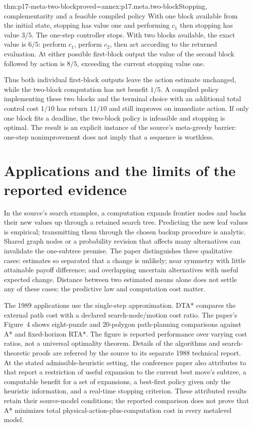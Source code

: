 \begin{hbtheorem}{thm:p17-meta-two-block}{proved=annex:p17.meta.two-block}{Stopping, complementarity and a feasible compiled policy}
With one block available from the initial state, stopping has value one
and performing \(c_1\) then stopping has value \(3/5\).
The one-step controller stops. With two blocks available, the exact
value is \(6/5\): perform \(c_1\), perform \(c_2\), then act
according to the returned evaluation. At either possible first-block
output the value of the second block followed by action is \(8/5\),
exceeding the current stopping value one.

Thus both individual first-block outputs leave the action estimate
unchanged, while the two-block computation has net benefit \(1/5\).
A compiled policy implementing these two blocks and the terminal choice
with an additional total control cost \(1/10\) has return \(11/10\)
and still improves on immediate action. If only one block fits a deadline,
the two-block policy is infeasible and stopping is optimal.
The result is an explicit instance of the source's meta-greedy barrier:
one-step nonimprovement does not imply that a sequence is worthless.
\end{hbtheorem}

\section{Applications and the limits of the reported evidence}
\label{sec:p17-meta-applications}

In the source's search examples, a computation expands frontier nodes
and backs their new values up through a retained search tree. Predicting
the new leaf values is empirical; transmitting them through the chosen
backup procedure is analytic. Shared graph nodes or a probability revision
that affects many alternatives can invalidate the one-subtree premise.
The paper distinguishes three qualitative cases: estimates so separated
that a change is unlikely; near symmetry with little attainable payoff
difference; and overlapping uncertain alternatives with useful expected
change. Distance between two estimated means alone does not settle any
of these cases; the predictive law and computation cost matter.

The 1989 applications use the single-step approximation. DTA* compares
the external path cost with a declared search-node/motion cost ratio.
The paper's Figure~4 shows eight-puzzle and 20-polygon path-planning comparisons
against A* and fixed-horizon RTA*. The figure is reported performance
over varying cost ratios, not a universal optimality theorem. Details
of the algorithms and search-theoretic proofs are referred by the source
to its separate 1988 technical report.
At the stated admissible-heuristic setting, the conference paper also
attributes to that report a restriction of useful expansion to the
current best move's subtree, a computable benefit for a set of expansions,
a best-first policy given only the heuristic information, and a real-time
stopping criterion. These attributed results retain their source-model
conditions; the reported comparison does not prove that A* minimizes
total physical-action-plus-computation cost in every metalevel model.

